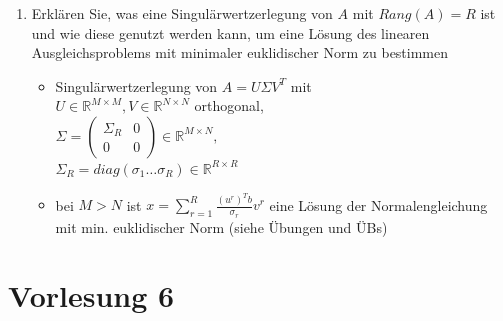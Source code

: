 \documentclass[]{article}
\begin{document}
\begin{enumerate}
\begin{itemize}
			\end{itemize}
		\item Erklären Sie, was eine Singulärwertzerlegung von $A$ mit $Rang(A) = R$ ist und wie diese genutzt werden kann, um eine Lösung des linearen Ausgleichsproblems mit minimaler euklidischer Norm zu bestimmen
			\begin{itemize}
				\item Singulärwertzerlegung von $A = U \Sigma V^T$ mit \\
				$U \in \mathbb{R}^{M \times M},V \in \mathbb{R}^{N \times N}$ orthogonal, \\
				$\Sigma = \left (\begin{array}{cc} \Sigma_R & 0 \\ 0&0 \end{array} \right) \in \mathbb{R}^{M \times N},$ \\ $\Sigma_R = diag(\sigma_1 \dots \sigma_R) \in \mathbb{R}^{R \times R}$
				\item bei $M>N$ ist $x = \sum_{r=1}^{R} \frac{(u^r)^Tb}{\sigma_r}v^r$ eine Lösung der Normalengleichung mit min. euklidischer Norm (siehe Übungen und ÜBs)
			\end{itemize}
	\end{enumerate}

\section{Vorlesung 6}
\end{document}
